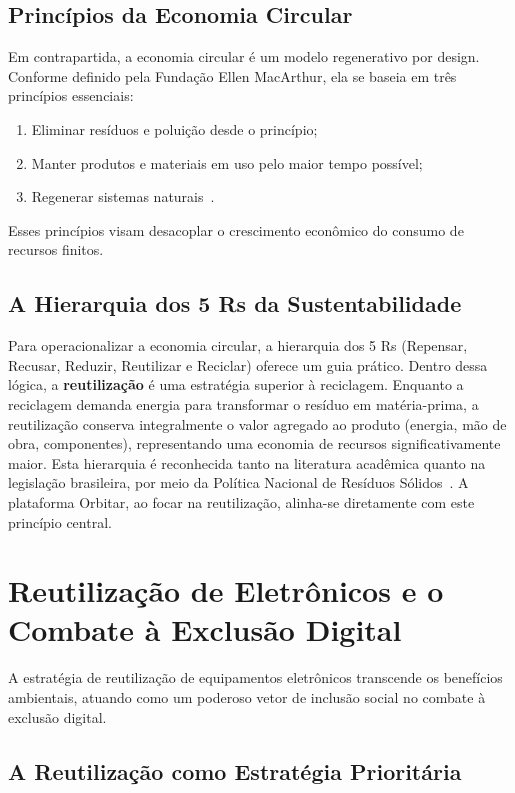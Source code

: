 \documentclass[
	12pt,				%
	openright,			%
	oneside,			%
	a4paper,			%
	english,			%
	brazil				%
	]{abntex2}
\theoremstyle{definition}
\begin{document}
\subsection{Princípios da Economia Circular}

Em contrapartida, a economia circular é um modelo regenerativo por design. Conforme definido pela Fundação Ellen MacArthur, ela se baseia em três princípios essenciais:

\begin{enumerate}
    \item Eliminar resíduos e poluição desde o princípio;
    \item Manter produtos e materiais em uso pelo maior tempo possível;
    \item Regenerar sistemas naturais~\cite{EMF2013}.
\end{enumerate}

Esses princípios visam desacoplar o crescimento econômico do consumo de recursos finitos.

\subsection{A Hierarquia dos 5 Rs da Sustentabilidade}

Para operacionalizar a economia circular, a hierarquia dos 5 Rs (Repensar, Recusar, Reduzir, Reutilizar e Reciclar) oferece um guia prático. Dentro dessa lógica, a \textbf{reutilização} é uma estratégia superior à reciclagem. Enquanto a reciclagem demanda energia para transformar o resíduo em matéria-prima, a reutilização conserva integralmente o valor agregado ao produto (energia, mão de obra, componentes), representando uma economia de recursos significativamente maior. Esta hierarquia é reconhecida tanto na literatura acadêmica quanto na legislação brasileira, por meio da Política Nacional de Resíduos Sólidos~\cite{Kirchherr2017, Brasil2010}. A plataforma Orbitar, ao focar na reutilização, alinha-se diretamente com este princípio central.

\section{Reutilização de Eletrônicos e o Combate à Exclusão Digital}

A estratégia de reutilização de equipamentos eletrônicos transcende os benefícios ambientais, atuando como um poderoso vetor de inclusão social no combate à exclusão digital.

\subsection{A Reutilização como Estratégia Prioritária}
\end{document}
